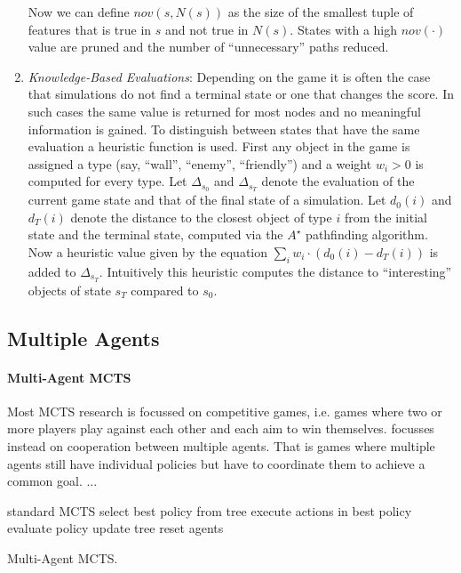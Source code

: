 \begin{enumerate}[label=\alph*)]
    Now we can define $nov(s,N(s))$ as the size of the smallest tuple of features that is true in $s$ and not true in $N(s)$. States with a high $nov(\cdot)$ value are pruned and the number of \enquote{unnecessary} paths reduced.
    \item \textit{Knowledge-Based Evaluations}: Depending on the game it is often the case that simulations do not find a terminal state or one that changes the score. In such cases the same value is returned for most nodes and no meaningful information is gained. To distinguish between states that have the same evaluation a heuristic function is used. First any object in the game is assigned a type (say, \enquote{wall}, \enquote{enemy}, \enquote{friendly}) and a weight $w_i > 0$ is computed for every type. Let $\Delta_{s_0}$ and $\Delta_{s_T}$ denote the evaluation of the current game state and that of the final state of a simulation. Let $d_0(i)$ and $d_T(i)$ denote the distance to the closest object of type $i$ from the initial state and the terminal state, computed via the $A^\star$ pathfinding algorithm. Now a heuristic value given by the equation $\sum_i w_i \cdot (d_0(i) - d_T(i))$ is added to $\Delta_{s_T}$. Intuitively this heuristic computes the distance to \enquote{interesting} objects of state $s_T$ compared to $s_0$. 
\end{enumerate}
\subsection{Multiple Agents}
\paragraph{Multi-Agent MCTS}
Most MCTS research is focussed on competitive games, i.e. games where two or more players play against each other and each aim to win themselves. \cite{zerbel2019multiagent} focusses instead on cooperation between multiple agents. That is games where multiple agents still have individual policies but have to coordinate them to achieve a common goal. ... 

\begin{algorithm}[htbp]
\begin{algorithmic}
\State standard MCTS
\EndFor
{}
\State select best policy from tree
\State execute actions in best policy
\EndFor
{}
\State evaluate policy
\State update tree
\EndFor
\State reset agents
\EndFor
\end{algorithmic}
\caption{Multi-Agent MCTS.}
\label{alg:mamcts}
\end{algorithm}
